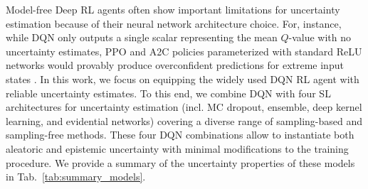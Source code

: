 Model-free Deep RL agents often show important limitations for uncertainty estimation because of their neural network architecture choice. For, instance, while DQN only outputs a single scalar representing the mean $Q$-value with no uncertainty estimates, PPO and A2C policies parameterized with standard ReLU networks would provably produce overconfident predictions for extreme input states \cite{overconfident-relu}. In this work, we focus on equipping the widely used DQN RL agent with reliable uncertainty estimates. To this end, we combine DQN with four SL architectures for uncertainty estimation (incl. MC dropout, ensemble, deep kernel learning, and evidential networks) covering a diverse range of sampling-based and sampling-free methods. These four DQN combinations allow to instantiate both aleatoric and epistemic uncertainty with minimal modifications to the training procedure.  We provide a summary of the uncertainty properties of these models in Tab.~\ref{tab:summary_models}.

\begin{table*}[ht!]
    \vspace{-0mm}
	\caption{Summary of the uncertainty properties of the models.}
	\label{tab:summary_models}
	\vspace{-0mm}
	\centering
	\vspace{-0mm}
\end{table*}

